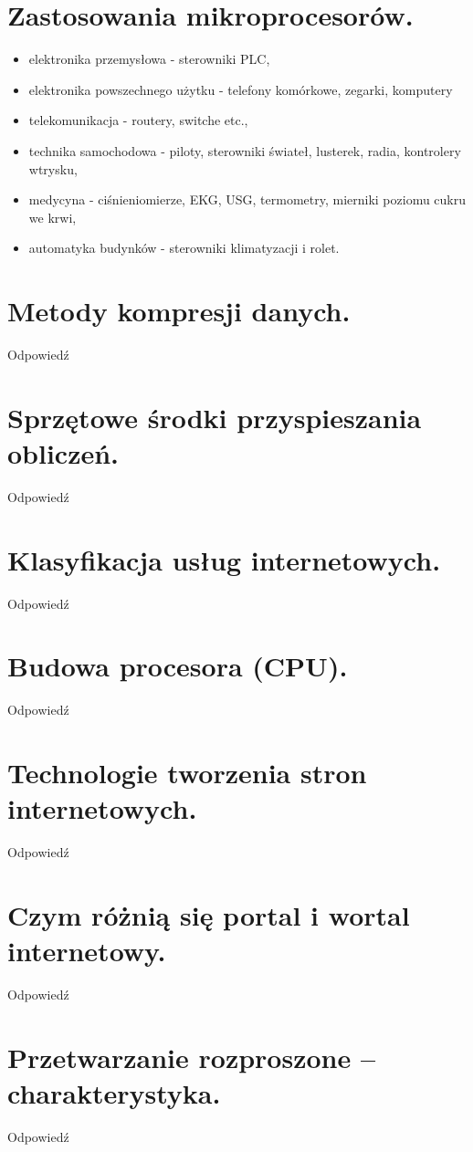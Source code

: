 \documentclass[12pt,a4paper]{article}
\begin{document}
	\section{Zastosowania mikroprocesorów.}
	\begin{itemize}
		\item elektronika przemysłowa - sterowniki PLC,
		\item elektronika powszechnego użytku - telefony komórkowe, zegarki, komputery
		\item telekomunikacja - routery, switche etc.,
		\item technika samochodowa - piloty, sterowniki świateł, lusterek, radia, kontrolery wtrysku,
		\item medycyna - ciśnieniomierze, EKG, USG, termometry, mierniki poziomu cukru we krwi,
		\item automatyka budynków - sterowniki klimatyzacji i rolet.
	\end{itemize}

	\section{Metody kompresji danych.}
	Odpowiedź

	\section{Sprzętowe środki przyspieszania obliczeń.}
	Odpowiedź

	\section{Klasyfikacja usług internetowych.}
	Odpowiedź

	\section{Budowa procesora (CPU).}
	Odpowiedź

	\section{Technologie tworzenia stron internetowych.}
	Odpowiedź

	\section{Czym różnią się portal i wortal internetowy.}
	Odpowiedź

	\section{Przetwarzanie rozproszone – charakterystyka.}
	Odpowiedź
\end{document}
